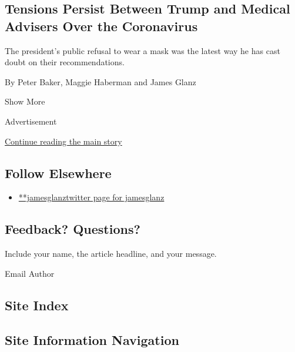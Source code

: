 \begin{enumerate}
  \hypertarget{tensions-persist-between-trump-and-medical-advisers-over-the-coronavirus}{%
  \subsection{Tensions Persist Between Trump and Medical Advisers Over
  the
  Coronavirus}\label{tensions-persist-between-trump-and-medical-advisers-over-the-coronavirus}}

  The president's public refusal to wear a mask was the latest way he
  has cast doubt on their recommendations.

  By Peter Baker, Maggie Haberman and James Glanz
\end{enumerate}

Show More

Advertisement

\protect\hyperlink{after-mid2}{Continue reading the main story}

\hypertarget{follow-elsewhere}{%
\subsection{Follow Elsewhere}\label{follow-elsewhere}}

\begin{itemize}
\tightlist
\item
  \href{https://twitter.com/jamesglanz}{**jamesglanztwitter page for
  jamesglanz}
\end{itemize}

\hypertarget{feedback-questions}{%
\subsection{Feedback? Questions?}\label{feedback-questions}}

Include your name, the article headline, and your message.

Email Author

\hypertarget{site-index}{%
\subsection{Site Index}\label{site-index}}

\hypertarget{site-information-navigation}{%
\subsection{Site Information
Navigation}\label{site-information-navigation}}

